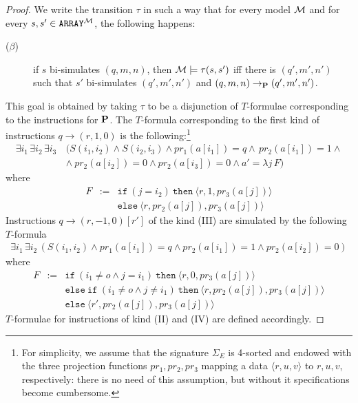 \documentclass{LMCS}
\newcommand{\cM}{\ensuremath \mathcal M}
\theoremstyle{plain}\newtheorem{assumption}[thm]{Assumption}
\theoremstyle{plain}\newtheorem{proposition}[thm]{Proposition}
\theoremstyle{plain}\newtheorem{property}[thm]{Property}
\theoremstyle{plain}\newtheorem{example}[thm]{Example}
\theoremstyle{plain}\newtheorem{claim}[thm]{Claim}
\theoremstyle{plain}\newtheorem{lemma}[thm]{Lemma}
\begin{document}
\begin{proof}
We write the transition $\tau$ in such a way that for every model
$\cM$ and for every $s,s'\in \mathtt{ARRAY}^{\cM}$, the following
happens:
\begin{description}
\item[{\rm ($\beta$)}] if $s$ bi-simulates $(q,m,n)$, then $\cM\models
  \tau(s,s')$ iff there is $(q', m', n')$ such that $s'$ bi-simulates
  $(q', m', n')$ and $(q,m,n)\to_{\bf P} (q', m', n')$.
\end{description}
This goal is obtained by taking $\tau$ to be a disjunction of
$T$-formulae corresponding to the instructions for $\bf P$. The
$T$-formula corresponding to the first kind of instructions
$q\to(r,1,0)$ is the following:\footnote{For simplicity,
we assume that the
  signature $\Sigma_E$ is 4-sorted and endowed with the three
  projection functions $pr_1, pr_2, pr_3$ mapping a data $\langle r, u,v\rangle$ to $r, u,v$, respectively:  
there is no need of this assumption,
  but without it specifications become cumbersome.}
\begin{eqnarray*}
  \exists i_1\,\exists i_2\, \exists i_3\,
  & (S(i_1, i_2) \wedge S(i_2,i_3)\wedge pr_1(a[i_1])= q\wedge  \, pr_2( a[i_1])=1 \wedge
   \\ &
  \wedge~ pr_2(a[i_2])= 0 \wedge
  pr_2(a[i_3])=0\wedge a'=\lambda j\, F)
\end{eqnarray*}
where
\begin{eqnarray*}
F & := & \mathtt{if} ~(j=i_2)~ \mathtt{then}~ \langle r, 1, pr_3(a[j])\rangle
  \\ 
  && \mathtt{else} ~\langle r, pr_2(a[j]), pr_3(a[j])\rangle
\end{eqnarray*}
Instructions $q\to(r,-1,0)[r']$ of the kind (III) are simulated by the
following $T$-formula
\begin{eqnarray*}
  \exists i_1\,\exists i_2\, (S(i_1, i_2) \wedge pr_1(a[i_1])= q\wedge
  pr_2( a[i_1])=1 \wedge
  pr_2(a[i_2])= 0)
\end{eqnarray*}
where
\begin{eqnarray*}
  F & := & \mathtt{if}~ (i_1\not=o \wedge j=i_1) ~\mathtt{then}~ \langle r, 0, pr_3(a[j])\rangle \\
  &&\mathtt{else~ if}~ (i_1\not=o \wedge j\not=i_1) ~\mathtt{then}~\langle r, pr_2(a[j]), pr_3(a[j])\rangle \\
  &&\mathtt{else}~ \langle r', pr_2(a[j]), pr_3(a[j])\rangle
\end{eqnarray*}
$T$-formulae for instructions of kind (II) and (IV) are defined
accordingly.


\end{proof}
\end{document}
